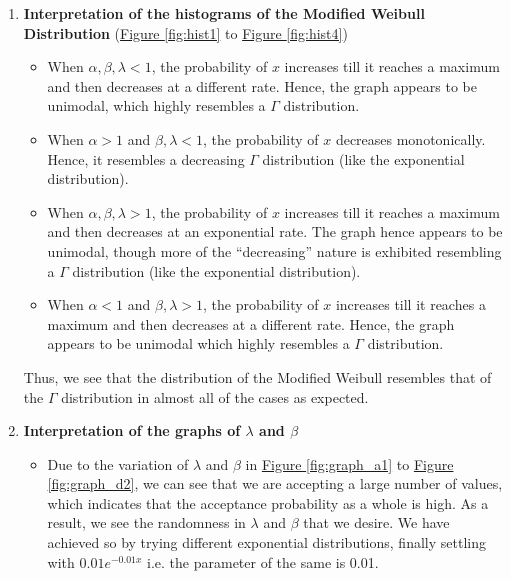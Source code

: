 \documentclass[11pt]{article}
\numberwithin{equation}{section}
\begin{document}
\begin{enumerate}
	\item \textbf{Interpretation of the histograms of the Modified Weibull Distribution} (\hyperref[fig:hist1]{Figure \ref*{fig:hist1}} to \hyperref[fig:hist4]{Figure \ref*{fig:hist4}})
	\begin{itemize}
		\item When $\alpha, \beta, \lambda < 1$, the probability of $x$ increases till it reaches a maximum and then decreases at a different rate. Hence, the graph appears to be unimodal, which highly resembles a $\Gamma$ distribution.

		\item When $\alpha > 1$ and $\beta, \lambda < 1$, the probability of $x$ decreases monotonically. Hence, it resembles a decreasing $\Gamma$ distribution (like the exponential distribution).

		\item When $\alpha, \beta, \lambda > 1$, the probability of $x$ increases till it reaches a maximum and then decreases at an exponential rate. The graph hence appears to be unimodal, though more of the ``decreasing'' nature is exhibited resembling a $\Gamma$ distribution (like the exponential distribution).

		\item When $\alpha < 1$ and $\beta, \lambda > 1$, the probability of $x$ increases till it reaches a maximum and then decreases at a different rate. Hence, the graph appears to be unimodal which highly resembles a $\Gamma$ distribution.
	\end{itemize}

	Thus, we see that the distribution of the Modified Weibull resembles that of the $\Gamma$ distribution in almost all of the cases as expected. \medskip

	\item \textbf{Interpretation of the graphs of $\lambda$ and $\beta$}
	\begin{itemize}
		\item Due to the variation of $\lambda$ and $\beta$ in \hyperref[fig:graph_a1]{Figure \ref*{fig:graph_a1}} to \hyperref[fig:graph_d2]{Figure \ref*{fig:graph_d2}}, we can see that we are accepting a large number of values, which indicates that the acceptance probability as a whole is high. As a result, we see the randomness in $\lambda$ and $\beta$ that we desire. We have achieved so by trying different exponential distributions, finally settling with $0.01e^{-0.01x}$ i.e. the parameter of the same is 0.01.


\end{itemize}
\end{enumerate}
\end{document}
